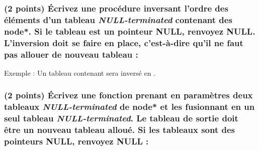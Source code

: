 \documentclass[11pt,a4paper]{article}
\begin{document}


\subsubsection{(2 points) \'Ecrivez une procédure inversant l'ordre des éléments d'un tableau \textit{NULL-terminated} contenant des node*. Si le tableau est un pointeur NULL, renvoyez NULL. L'inversion doit se faire en place, c'est-à-dire qu'il ne faut pas allouer de nouveau tableau : }

\setlength\fboxrule{0.2pt}
\noindent Exemple : Un tableau contenant  sera inversé en .
\setlength\fboxrule{0.4pt}

%



\begin{center}
\end{center}

\clearpage


\subsubsection{(2 points) \'Ecrivez une fonction prenant en paramètres deux tableaux \textit{NULL-terminated} de node* et les fusionnant en un seul tableau \textit{NULL-terminated}. Le tableau de sortie doit être un nouveau tableau alloué. Si les tableaux sont des pointeurs NULL, renvoyez NULL : }



\begin{center}
\end{center}
\end{document}
